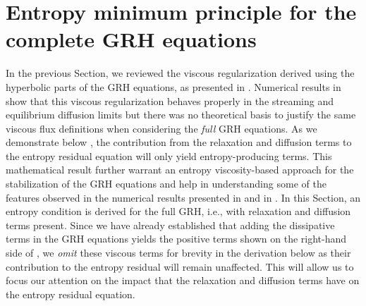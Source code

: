 \documentclass[times,doublespace]{fldauth}%
\begin{document}
\section{Entropy minimum principle for the complete GRH equations}
\label{sec:VR_new}
%
In the previous Section, we  reviewed the viscous regularization derived using the hyperbolic parts of the GRH equations, as presented in \cite{our_jcp_radhy_paper}. 
Numerical results in \cite{our_jcp_radhy_paper} show that this viscous regularization 
behaves properly in the streaming and equilibrium diffusion limits but there was no theoretical basis to justify the same viscous flux definitions when considering the \emph{full} GRH equations. As we 
demonstrate below , the contribution from the relaxation and diffusion terms to the entropy residual equation will only 
yield entropy-producing terms.
This mathematical result further warrant an entropy viscosity-based approach for the stabilization of the GRH equations 
and help in understanding  some of the features observed in the numerical results presented in  and in \cite{our_jcp_radhy_paper}.
%
%
In this Section, an entropy condition is derived for the full GRH, i.e., with relaxation and diffusion terms present.
Since we have already established that adding the dissipative terms in the GRH equations yields the positive terms shown on the right-hand side of 
, we \emph{omit} these viscous terms for brevity in the derivation below as their contribution to the entropy residual 
will remain unaffected. This will allow us to focus our attention on the impact that the relaxation and diffusion terms have on the entropy residual equation.
\end{document}
